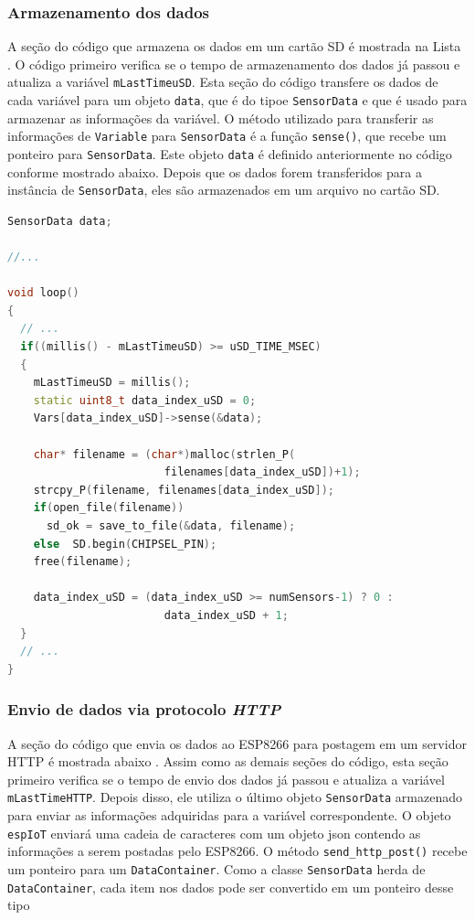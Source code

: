 \subsubsection{Armazenamento dos dados}

A seção do código que armazena os dados em um cartão SD é mostrada na Lista . O código primeiro verifica se o tempo de armazenamento dos dados já passou e atualiza a variável \texttt{mLastTimeuSD}. Esta seção do código transfere os dados de cada variável para um objeto \texttt{data}, que é do tipoe \texttt{SensorData} e que é usado para armazenar as informações da variável. O método utilizado para transferir as informações de \texttt{Variable} para \texttt{SensorData} é a função \texttt{sense()}, que recebe um ponteiro para \texttt{SensorData}. Este objeto \texttt{data} é definido anteriormente no código conforme mostrado abaixo. Depois que os dados forem transferidos para a instância de \texttt{SensorData}, eles são armazenados em um arquivo no cartão SD.

\begin{lstlisting}[language=C++, caption=Sequência de armazenamento de dados]
SensorData data;

//...

void loop()
{
  // ...
  if((millis() - mLastTimeuSD) >= uSD_TIME_MSEC)
  {
    mLastTimeuSD = millis();
    static uint8_t data_index_uSD = 0;
    Vars[data_index_uSD]->sense(&data);
    
    char* filename = (char*)malloc(strlen_P(
                        filenames[data_index_uSD])+1);
    strcpy_P(filename, filenames[data_index_uSD]);
    if(open_file(filename)) 
      sd_ok = save_to_file(&data, filename);
    else  SD.begin(CHIPSEL_PIN);
    free(filename);
  
    data_index_uSD = (data_index_uSD >= numSensors-1) ? 0 : 
                        data_index_uSD + 1;
  }
  // ...
}
\end{lstlisting}

\subsubsection{Envio de dados via protocolo \textit{HTTP}}

A seção do código que envia os dados ao ESP8266 para postagem em um servidor HTTP é mostrada abaixo . Assim como as demais seções do código, esta seção primeiro verifica se o tempo de envio dos dados já passou e atualiza a variável \texttt{mLastTimeHTTP}. Depois disso, ele utiliza o último objeto \texttt{SensorData} armazenado para enviar as informações adquiridas para a variável correspondente. O objeto \texttt{espIoT} enviará uma cadeia de caracteres com um objeto \acrshort{json} contendo as informações a serem postadas pelo ESP8266. O método \texttt{send\_http\_post()} recebe um ponteiro para um \texttt{DataContainer}. Como a classe \texttt{SensorData} herda de \texttt{DataContainer}, cada item nos dados pode ser convertido em um ponteiro desse tipo

